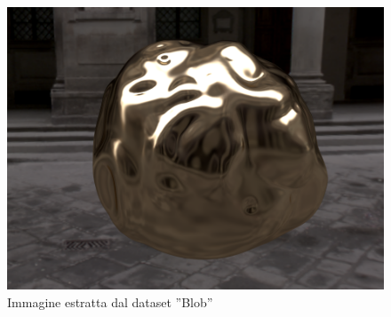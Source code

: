 \begin{figure}[ht]
    \centering
    \begin{minipage}[b]{0.32\linewidth}
        \centering
        \includegraphics[width=\linewidth]{img/Blob.png}
        \caption{Immagine estratta dal dataset ”Blob”}
        \label{fig:Blob}
    \end{minipage}
\end{figure}